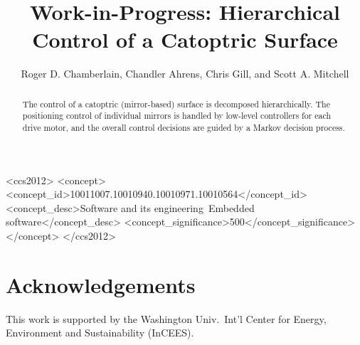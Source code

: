 \documentclass[sigconf]{acmart}
\begin{document}
\title{Work-in-Progress: Hierarchical Control of a Catoptric Surface}


\author{Roger D. Chamberlain, Chandler Ahrens, Chris Gill, and Scott A. Mitchell}


\renewcommand{\shortauthors}{R. Chamberlain et al.}


\begin{abstract}
The control of a catoptric (mirror-based) surface is decomposed
hierarchically. The positioning control of individual mirrors
is handled by low-level controllers for each drive motor, and the
overall control decisions are guided by a Markov decision process.
\end{abstract}

%
%
\begin{CCSXML}
<ccs2012>
<concept>
<concept_id>10011007.10010940.10010971.10010564</concept_id>
<concept_desc>Software and its engineering~Embedded software</concept_desc>
<concept_significance>500</concept_significance>
</concept>
</ccs2012>
\end{CCSXML}





\maketitle






\section*{Acknowledgements}
This work is supported by the Washington Univ.~Int'l Center for
Energy, Environment and Sustainability (InCEES).



\end{document}
